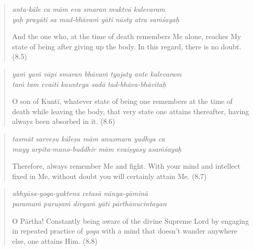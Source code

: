 \documentclass[12pt, twoside, openright]{memoir}
\begin{document}
\par
\begin{verse}
\textit{anta-kāle ca mām eva smaran muktvā kalevaram} \\
\textit{yaḥ prayāti sa mad-bhāvaṁ yāti nāsty atra saṁśayaḥ}

\noindent And the one who, at the time of death remembers Me alone, reaches My state of being after giving up the body. In this regard, there is no doubt. (8.5)
\end{verse}
\par



\par
\begin{verse}
\textit{yaṁ yaṁ vāpi smaran bhāvaṁ tyajaty ante kalevaram} \\
\textit{taṁ tam evaiti kaunteya sadā tad-bhāva-bhāvitaḥ}

\noindent O son of Kuntī, whatever state of being one remembers at the time of death while leaving the body, that very state one attains thereafter, having always been absorbed in it. (8.6)
\end{verse}
\par



\par
\begin{verse}
\textit{tasmāt sarveṣu kāleṣu mām anusmara yudhya ca} \\
\textit{mayy arpita-mano-buddhir mām evaiṣyasy asaṁśayaḥ}

\noindent Therefore, always remember Me and fight. With your mind and intellect fixed in Me, without doubt you will certainly attain Me. (8.7)
\end{verse}
\par



\par
\begin{verse}
\textit{abhyāsa-yoga-yuktena cetasā nānya-gāminā} \\
\textit{paramaṁ puruṣaṁ divyaṁ yāti pārthānucintayan}

\noindent O Pārtha! Constantly being aware of the divine Supreme Lord by engaging in repeated practice of \textit{yoga} with a mind that doesn't wander anywhere else, one attains Him. (8.8)
\end{verse}
\par
\end{document}

